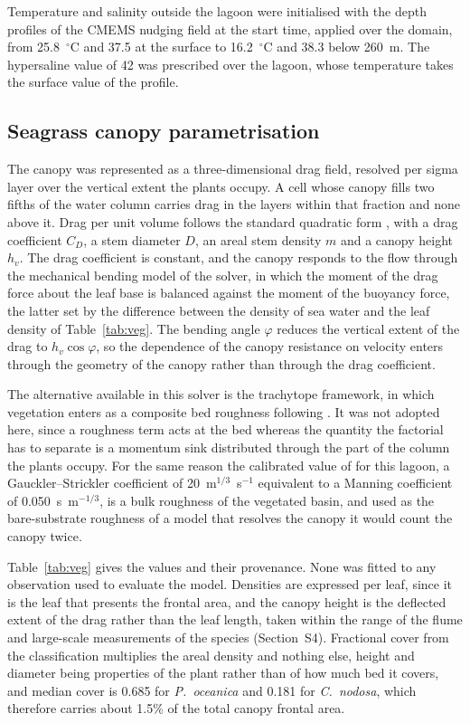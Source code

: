 Temperature and salinity outside the lagoon were initialised with the depth
profiles of the CMEMS nudging field at the start time, applied over the domain,
from 25.8~$^\circ$C and 37.5 at the surface to 16.2~$^\circ$C and 38.3 below
260~m. The hypersaline value of 42 was prescribed over the lagoon, whose
temperature takes the surface value of the profile.

\subsection{Seagrass canopy parametrisation}
\label{sec:methods_roughness}

The canopy was represented as a three-dimensional drag field, resolved per sigma
layer over the vertical extent the plants occupy. A cell whose canopy fills two
fifths of the water column carries drag in the layers within that fraction and
none above it. Drag per unit volume follows the standard quadratic form
\citep{Nepf2012}, with a drag coefficient $C_D$, a stem diameter $D$, an areal
stem density $m$ and a canopy height $h_v$. The drag coefficient is constant,
and the canopy responds to the flow through the mechanical bending model of the
solver, in which the moment of the drag force about the leaf base is balanced
against the moment of the buoyancy force, the latter set by the difference
between the density of sea water and the leaf density of Table~\ref{tab:veg}.
The bending angle $\varphi$ reduces the vertical extent of the drag to
$h_v \cos\varphi$, so the dependence of the canopy resistance on velocity
enters through the geometry of the canopy rather than through the drag
coefficient.

The alternative available in this solver is the trachytope framework, in which
vegetation enters as a composite bed roughness following \citet{Baptist2007}.
It was not adopted here, since a roughness term acts at the bed whereas the
quantity the factorial has to separate is a momentum sink distributed through
the part of the column the plants occupy. For the same reason the calibrated
value of \citet{Ingrassia2024} for this lagoon, a Gauckler--Strickler
coefficient of 20~m$^{1/3}$~s$^{-1}$ equivalent to a Manning coefficient of
0.050~s~m$^{-1/3}$, is a bulk roughness of the vegetated basin, and used as the
bare-substrate roughness of a model that resolves the canopy it would count the
canopy twice.

Table~\ref{tab:veg} gives the values and their provenance. None was fitted to
any observation used to evaluate the model. Densities are expressed per leaf,
since it is the leaf that presents the frontal area, and the canopy height is
the deflected extent of the drag rather than the leaf length, taken within the
range of the flume and large-scale measurements of the species
(Section~S4). Fractional cover from the classification multiplies the areal
density and nothing else, height and diameter being properties of the plant
rather than of how much bed it covers, and median cover is 0.685 for
\emph{P.\ oceanica} and 0.181 for \emph{C.\ nodosa}, which therefore carries
about 1.5\% of the total canopy frontal area.

